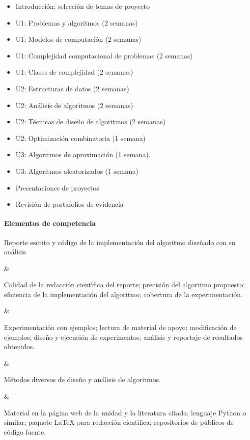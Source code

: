 \begin{itemize}[itemsep=-3pt]
\item{Introducci\'{o}n; selecci\'{o}n de temas de proyecto}
\item{U1: Problemas y algoritmos (2 semanas)}
\item{U1: Modelos de computaci\'{o}n (2 semanas)} 
\item{U1: Complejidad computacional de problemas (2 semanas)}
\item{U1: Clases de complejidad (2 semanas)} 
\item{U2: Estructuras de datos (2 semanas)} 
\item{U2: An\'{a}lisis de algoritmos (2 semanas)}
\item{U2: T\'{e}cnicas de dise\~{n}o de algoritmos (2 semanas)} 
\item{U2: Optimizaci\'{o}n combinatoria (1 semana)} 
\item{U3: Algoritmos de aproximaci\'{o}n (1 semana).}
\item{U3: Algoritmos aleatorizados (1 semana)} 
\item{Presentaciones de proyectos}
\item{Revisi\'{o}n de portafolios de evidencia}
\end{itemize}

\paragraph{Elementos de competencia}

\quad



Reporte escrito y c\'{o}digo de la implementaci\'{o}n del algoritmo
dise\~{n}ado con su an\'{a}lisis

&

Calidad de la redacci\'{o}n cient\'{\i}fica del reporte; 
precisi\'{o}n del algoritmo propuesto;
eficiencia de la implementaci\'{o}n del algoritmo;
cobertura de la experimentaci\'{o}n.

&

Experimentaci\'{o}n con ejemplos; lectura de material de apoyo;
modificaci\'{o}n de ejemplos; dise\~{n}o y ejecuci\'{o}n de experimentos;
an\'{a}lisis y reportaje de resultados obtenidos.

&

M\'{e}todos diversos de dise\~{n}o y an\'{a}lisis de algoritmos.

&

Material en la p\'{a}gina web de la unidad y la literatura citada;
lenguaje Python o similar; paquete {\LaTeX} para redacci\'{o}n cient\'{\i}fica;
repositorios de p\'{u}blicos de c\'{o}digo fuente. \\ \hline

